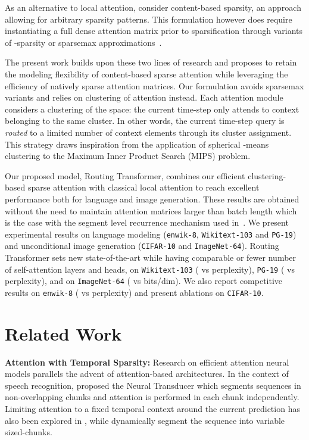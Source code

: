 \documentclass[a4paper]{article}
\begin{document}
As an alternative to local attention, \citet{correia2019adaptively} 
consider content-based sparsity, an approach allowing for arbitrary 
sparsity patterns. This formulation however does require instantiating a full 
dense attention matrix prior to sparsification through variants of -sparsity 
or sparsemax approximations~\citep{blondel2019Fenchel}.

The present work builds upon these two lines of research and proposes to retain 
the modeling flexibility of content-based sparse attention while
leveraging the efficiency of natively sparse attention matrices.
Our formulation avoids sparsemax variants and relies on clustering of attention 
instead. Each attention module considers a clustering of the space: the
current time-step only attends to context belonging to the same cluster.
In other words, the current time-step query is \emph{routed} to a limited
number of context elements through its cluster assignment. This strategy draws inspiration
from the application of spherical -means clustering to the Maximum Inner
Product Search (MIPS) problem.

Our proposed model, Routing Transformer, combines our efficient clustering-based 
sparse attention with classical local attention to reach excellent performance 
both for language and image generation. These results are obtained without the 
need to maintain attention matrices larger than batch length which is the case 
with the segment level recurrence mechanism used in~\citet{dai2019transformer,
sukhbaatar2019adaptive}. 
We present experimental results on language modeling 
(\texttt{enwik-8}, \texttt{Wikitext-103} and \texttt{PG-19}) and unconditional image generation (\texttt{CIFAR-10} and \texttt{ImageNet-64}). 
Routing Transformer sets new state-of-the-art while having comparable or fewer 
number of self-attention layers and heads, on 
\texttt{Wikitext-103} ( vs  perplexity),
\texttt{PG-19} ( vs  perplexity),
and on \texttt{ImageNet-64} ( vs  bits/dim). We also report
competitive results on \texttt{enwik-8} ( vs  perplexity)
and present ablations on \texttt{CIFAR-10}.

\section{Related Work}

{\bf Attention with Temporal Sparsity:} 
Research on efficient attention neural models parallels the advent of
attention-based architectures.
In the context of speech recognition, \citet{jaitly2016online} proposed the 
Neural Transducer which segments sequences in non-overlapping chunks and 
attention is performed in each chunk independently. Limiting attention to a 
fixed temporal context around the current prediction has also been explored in
\citet{chorowski2015attention}, while \citet{chiu2018monotonic} dynamically 
segment the sequence into variable sized-chunks.
\end{document}

